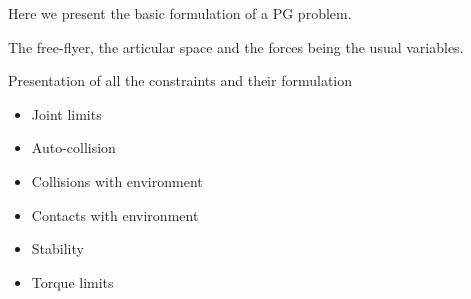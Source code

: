 Here we present the basic formulation of a PG problem.

The free-flyer, the articular space and the forces being the usual variables.

Presentation of all the constraints and their formulation
\begin{itemize}
  \item Joint limits
  \item Auto-collision
  \item Collisions with environment
  \item Contacts with environment
  \item Stability
  \item Torque limits
\end{itemize}

